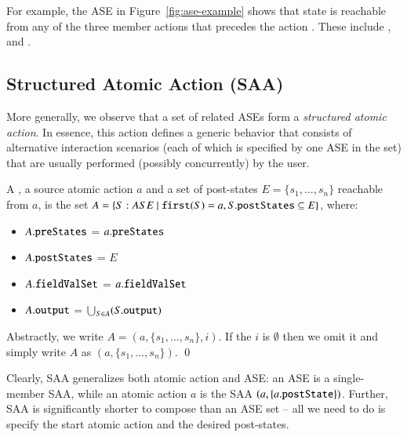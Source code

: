 For example, the ASE in Figure~\ref{fig:ase-example} shows that state  is reachable from any of the three member actions that precedes the action . These include ,  and . 

\subsection{Structured Atomic Action (SAA)} \label{sect:arch-saa}

More generally, we observe that a set of related ASEs form a \textit{structured atomic action}. In essence, this action defines a generic behavior that consists of alternative interaction scenarios (each of which is specified by one ASE in the set) that are usually performed (possibly concurrently) by the user.
%
\begin{definition} \label{def:saa}
	A , \wrt a source atomic action $ a $ and a set of post-states $ E = \{ s_{1},\dots,s_{n} \} $ reachable from $a$, is the set $ A = \{S: ASE ~|~ \func{first}(S) = a, S.\attribn{postStates} \subseteq E \} $, where:
  \begin{itemize}
  \item $A.{\tt preStates}$ = $a.{\tt preStates}$
  \item $A.{\tt postStates}$ = $E$
  \item $A.{\tt fieldValSet}$ = $a.{\tt fieldValSet}$
  \item $A.{\tt output}$ = $\bigcup_{S \in A} (S.{\tt output})$
  \end{itemize}

  Abstractly, we write $ A = (a, \{ s_{1},\dots,s_{n} \}, i) $. If the  $i$ is $\emptyset$ then we omit it and simply write $A$ as $(a, \{ s_{1},\dots,s_{n} \})$. \qed
\end{definition}

Clearly, SAA generalizes both atomic action and ASE: an ASE is a single-member SAA, while an atomic action $ a $ is the SAA 
%
$ (a, \{ a.{\tt postState} \}) $.
%
Further, SAA is significantly shorter to compose than an ASE set -- all we need to do is specify the start atomic action and the desired post-states. 

